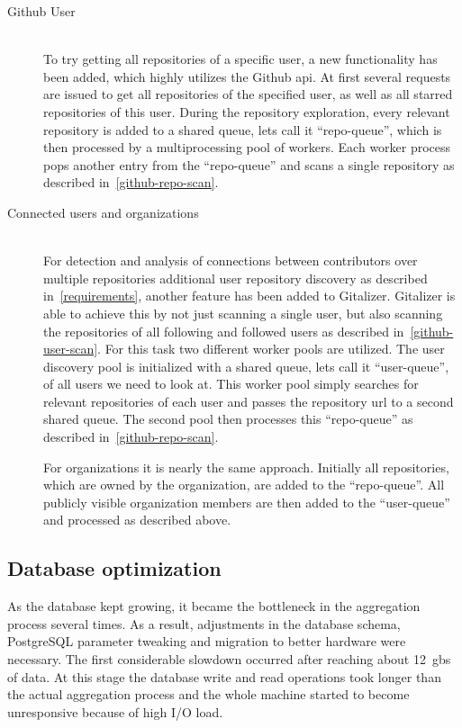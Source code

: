 \begin{description}
    \item[Github User]\label{github-repo-scan} \hfill \\
        To try getting all repositories of a specific user, a new functionality has been added, which highly utilizes the Github \ac{api}.
        At first several requests are issued to get all repositories of the specified user, as well as all starred repositories of this user.
        During the repository exploration, every relevant repository is added to a shared queue, lets call it ``repo-queue'', which is then processed by a multiprocessing pool of workers.
        Each worker process pops another entry from the ``repo-queue'' and scans a single repository as described in~\ref{github-repo-scan}.


    \item[Connected users and organizations]\label{github-repo-scan} \hfill \\
        For detection and analysis of connections between contributors over multiple repositories additional user repository discovery as described in~\ref{requirements}, another feature has been added to Gitalizer.
        Gitalizer is able to achieve this by not just scanning a single user, but also scanning the repositories of all following and followed users as described in~\ref{github-user-scan}.
        For this task two different worker pools are utilized.
        The user discovery pool is initialized with a shared queue, lets call it ``user-queue'', of all users we need to look at.
        This worker pool simply searches for relevant repositories of each user and passes the repository \ac{url} to a second shared queue.
        The second pool then processes this ``repo-queue'' as described in~\ref{github-repo-scan}.

        For organizations it is nearly the same approach.
        Initially all repositories, which are owned by the organization, are added to the ``repo-queue''.
        All publicly visible organization members are then added to the ``user-queue'' and processed as described above.
\end{description}


\subsection{Database optimization}
As the database kept growing, it became the bottleneck in the aggregation process several times.
As a result, adjustments in the database schema, PostgreSQL parameter tweaking and migration to better hardware were necessary.
The first considerable slowdown occurred after reaching about 12~\acp{gb} of data.
At this stage the database write and read operations took longer than the actual aggregation process and the whole machine started to become unresponsive because of high I/O load.

